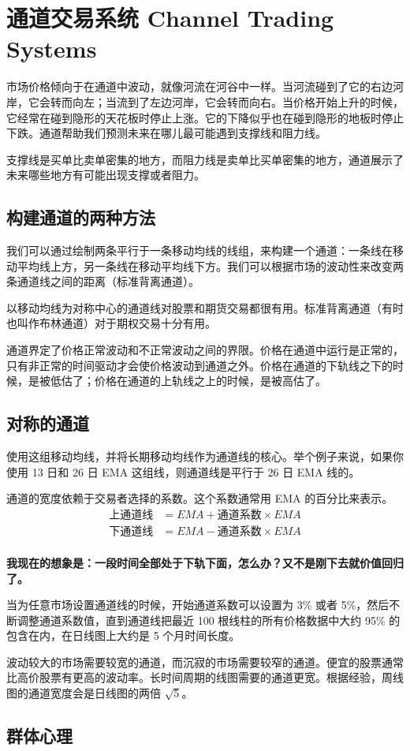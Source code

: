 \section{通道交易系统 Channel Trading Systems}
市场价格倾向于在通道中波动，就像河流在河谷中一样。当河流碰到了它的右边河岸，它会转而向左；当流到了左边河岸，它会转而向右。当价格开始上升的时候，它经常在碰到隐形的天花板时停止上涨。它的下降似乎也在碰到隐形的地板时停止下跌。通道帮助我们预测未来在哪儿最可能遇到支撑线和阻力线。

支撑线是买单比卖单密集的地方，而阻力线是卖单比买单密集的地方，通道展示了未来哪些地方有可能出现支撑或者阻力。
\subsection*{构建通道的两种方法}
我们可以通过绘制两条平行于一条移动均线的线组，来构建一个通道：一条线在移动平均线上方，另一条线在移动平均线下方。我们可以根据市场的波动性来改变两条通道线之间的距离（标准背离通道）。

以移动均线为对称中心的通道线对股票和期货交易都很有用。标准背离通道（有时也叫作布林通道）对于期权交易十分有用。

通道界定了价格正常波动和不正常波动之间的界限。价格在通道中运行是正常的，只有非正常的时间驱动才会使价格波动到通道之外。价格在通道的下轨线之下的时候，是被低估了；价格在通道的上轨线之上的时候，是被高估了。
\subsection*{对称的通道}
使用这组移动均线，并将长期移动均线作为通道线的核心。举个例子来说，如果你使用 13 日和 26 日 EMA 这组线，则通道线是平行于 26 日 EMA 线的。

通道的宽度依赖于交易者选择的系数。这个系数通常用 EMA 的百分比来表示。
\begin{equation}
    \begin{aligned}
        \text{上通道线} & =EMA+\text{通道系数}\times EMA \\
        \text{下通道线} & =EMA-\text{通道系数}\times EMA \\
    \end{aligned}
\end{equation}

\textbf{我现在的想象是：一段时间全部处于下轨下面，怎么办？又不是刚下去就价值回归了。}

当为任意市场设置通道线的时候，开始通道系数可以设置为 3\% 或者 5\%，然后不断调整通道系数值，直到通道线把最近 100 根线柱的所有价格数据中大约 95\% 的包含在内，在日线图上大约是 5 个月时间长度。

波动较大的市场需要较宽的通道，而沉寂的市场需要较窄的通道。便宜的股票通常比高价股票有更高的波动率。长时间周期的线图需要的通道更宽。根据经验，周线图的通道宽度会是日线图的两倍 $\sqrt{5}$。

\subsection*{群体心理}